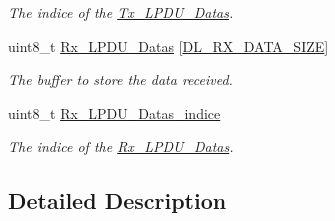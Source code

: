 \begin{DoxyCompactItemize}
\begin{DoxyCompactList}\small\item\em The indice of the \hyperlink{group___k_n_x___d_l___private___variables_ga441254f25e6b7d0eabfadce35a1e1465}{Tx\+\_\+\+L\+P\+D\+U\+\_\+\+Datas}. \end{DoxyCompactList}\item 
uint8\+\_\+t \hyperlink{group___k_n_x___d_l___private___variables_ga905a9a23e05da666d1cb773e5df722d1}{Rx\+\_\+\+L\+P\+D\+U\+\_\+\+Datas} \mbox{[}\hyperlink{group___d_l___exported___constants_ga62005b13a5a83d93b632643dd622bcef}{D\+L\+\_\+\+R\+X\+\_\+\+D\+A\+T\+A\+\_\+\+S\+I\+ZE}\mbox{]}\hypertarget{group___k_n_x___d_l___private___variables_ga905a9a23e05da666d1cb773e5df722d1}{}\label{group___k_n_x___d_l___private___variables_ga905a9a23e05da666d1cb773e5df722d1}

\begin{DoxyCompactList}\small\item\em The buffer to store the data received. \end{DoxyCompactList}\item 
uint8\+\_\+t \hyperlink{group___k_n_x___d_l___private___variables_ga073467595b9881c62bd4bf3fd26a8ba6}{Rx\+\_\+\+L\+P\+D\+U\+\_\+\+Datas\+\_\+indice}\hypertarget{group___k_n_x___d_l___private___variables_ga073467595b9881c62bd4bf3fd26a8ba6}{}\label{group___k_n_x___d_l___private___variables_ga073467595b9881c62bd4bf3fd26a8ba6}

\begin{DoxyCompactList}\small\item\em The indice of the \hyperlink{group___k_n_x___d_l___private___variables_ga905a9a23e05da666d1cb773e5df722d1}{Rx\+\_\+\+L\+P\+D\+U\+\_\+\+Datas}. \end{DoxyCompactList}\end{DoxyCompactItemize}


\subsection{Detailed Description}
